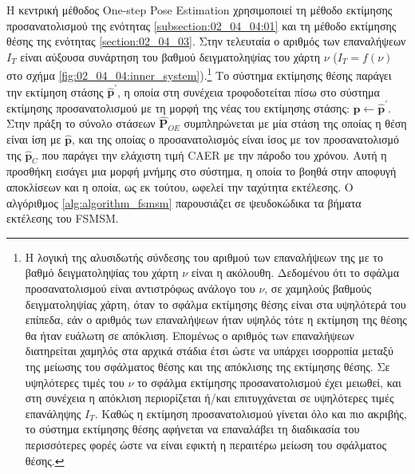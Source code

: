 Η κεντρική μέθοδος One-step Pose Estimation χρησιμοποιεί τη μέθοδο εκτίμησης
προσανατολισμού της ενότητας \ref{subsection:02_04_04:01} και τη μέθοδο
εκτίμησης θέσης της ενότητας \ref{section:02_04_03}.  Στην τελευταία ο αριθμός
των επαναλήψεων $I_T$ είναι αύξουσα συνάρτηση του βαθμού δειγματοληψίας του
χάρτη $\nu$ ($I_T = f(\nu)$ στο σχήμα
\ref{fig:02_04_04:inner_system}).\footnote{Η λογική της αλυσιδωτής σύνδεσης του
αριθμού των επαναλήψεων της με το βαθμό δειγματοληψίας του χάρτη $\nu$ είναι η
ακόλουθη. Δεδομένου ότι το σφάλμα προσανατολισμού είναι αντιστρόφως ανάλογο του
$\nu$, σε χαμηλούς βαθμούς δειγματοληψίας χάρτη, όταν το σφάλμα εκτίμησης θέσης
είναι στα υψηλότερά του επίπεδα, εάν ο αριθμός των επαναλήψεων ήταν υψηλός τότε
η εκτίμηση της θέσης θα ήταν ευάλωτη σε απόκλιση.  Επομένως ο αριθμός των
επαναλήψεων διατηρείται χαμηλός στα αρχικά στάδια έτσι ώστε να υπάρχει
ισορροπία μεταξύ της μείωσης του σφάλματος θέσης και της απόκλισης της
εκτίμησης θέσης. Σε υψηλότερες τιμές του $\nu$ το σφάλμα εκτίμησης
προσανατολισμού έχει μειωθεί, και στη συνέχεια η απόκλιση περιορίζεται ή/και
επιτυγχάνεται σε υψηλότερες τιμές επανάληψης $I_T$. Καθώς η εκτίμηση
προσανατολισμού γίνεται όλο και πιο ακριβής, το σύστημα εκτίμησης θέσης
αφήνεται να επαναλάβει τη διαδικασία του περισσότερες φορές ώστε να είναι
εφικτή η περαιτέρω μείωση του σφάλματος θέσης.} Το σύστημα εκτίμησης θέσης
παράγει την εκτίμηση στάσης $\hat{\bm{p}}^\prime$, η οποία στη συνέχεια
τροφοδοτείται πίσω στο σύστημα εκτίμησης προσανατολισμού με τη μορφή της νέας
του εκτίμησης στάσης: $\hat{\bm{p}} \leftarrow \hat{\bm{p}}^\prime$. Στην
πράξη το σύνολο στάσεων $\hat{\bm{P}}_{OE}$ συμπληρώνεται με μία στάση της
οποίας η θέση είναι ίση με $\hat{\bm{p}}$, και της οποίας ο προσανατολισμός
είναι ίσος με τον προσανατολισμό της $\hat{\bm{p}}_C$ που παράγει την ελάχιστη
τιμή CAER με την πάροδο του χρόνου. Αυτή η προσθήκη εισάγει μια μορφή μνήμης
στο σύστημα, η οποία το βοηθά στην αποφυγή αποκλίσεων και η οποία, ως εκ
τούτου, ωφελεί την ταχύτητα εκτέλεσης. Ο αλγόριθμος \ref{alg:algorithm_fsmsm}
παρουσιάζει σε ψευδοκώδικα τα βήματα εκτέλεσης του FSMSM.


